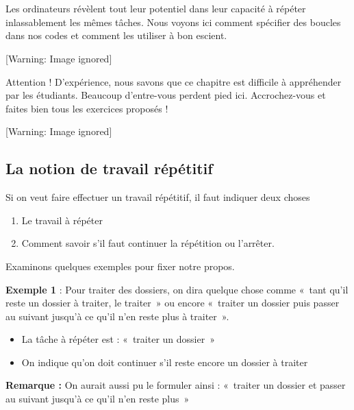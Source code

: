 \chapter[Les boucles]{}
{
Les ordinateurs révèlent tout leur potentiel dans leur capacité à
répéter inlassablement les mêmes tâches. Nous voyons ici comment
spécifier des boucles dans nos codes et comment les utiliser à bon
escient. \ }

\begin{center}
 [Warning: Image ignored] %

\end{center}
{
Attention ! D'expérience, nous savons que ce chapitre
est difficile à appréhender par les étudiants. Beaucoup
d'entre-vous perdent pied ici. Accrochez-vous et
faites bien tous les exercices proposés !}

\begin{center}
 [Warning: Image ignored] %

\end{center}
\section{La notion de travail répétitif}
{
Si on veut faire effectuer un travail répétitif, il faut indiquer deux
choses}

\liststyleNumberingi
\begin{enumerate}
\item {
Le travail à répéter}
\item {
Comment savoir s'il faut continuer la répétition ou
l'arrêter.}
\end{enumerate}
{
Examinons quelques exemples pour fixer notre propos.}

{
\textbf{Exemple 1} : Pour traiter des dossiers, on dira quelque chose
comme «~tant qu'il reste un dossier à traiter, le
traiter~» ou encore «~traiter un dossier puis passer au suivant
jusqu'à ce qu'il
n'en reste plus à traiter~».}

\liststyleListv
\begin{itemize}
\item {
La tâche à répéter est : «~traiter un dossier~»}
\item {
On indique qu'on doit continuer s'il
reste encore un dossier à traiter }
\end{itemize}
{
\textbf{Remarque :} On aurait aussi pu le formuler ainsi : «~traiter un
dossier et passer au suivant jusqu'à ce
qu'il n'en reste plus~»}

